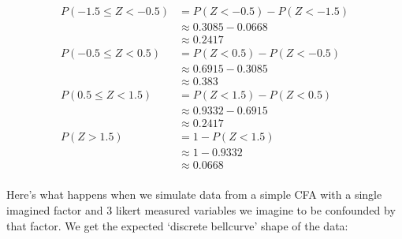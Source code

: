 \documentclass[
  letterpaper,
  DIV=11,
  numbers=noendperiod]{scrreprt}
\begin{document}
\[
\begin{align*}
P(-1.5 \leq Z < -0.5) & = P(Z < -0.5) - P(Z < -1.5) \\
                      & \approx 0.3085 - 0.0668 \\
                      & \approx 0.2417 \\
P(-0.5 \leq Z < 0.5)  & = P(Z < 0.5) - P(Z < -0.5) \\
                      & \approx 0.6915 - 0.3085 \\
                      & \approx 0.383 \\
P(0.5 \leq Z < 1.5)   & = P(Z < 1.5) - P(Z < 0.5) \\
                      & \approx 0.9332 - 0.6915 \\
                      & \approx 0.2417 \\
P(Z > 1.5)            & = 1 - P(Z < 1.5) \\
                      & \approx 1 - 0.9332 \\
                      & \approx 0.0668 \\
\end{align*}
\]

Here's what happens when we simulate data from a simple CFA with a
single imagined factor and 3 likert measured variables we imagine to be
confounded by that factor. We get the expected `discrete bellcurve'
shape of the data:
\end{document}
